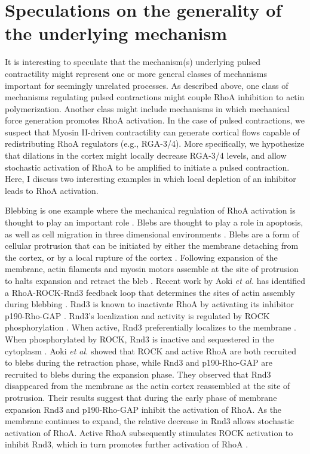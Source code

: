 \documentclass{ucetd}
\begin{document}
	
\section{Speculations on the generality of the underlying mechanism} 
It is interesting to speculate that the mechanism(s) underlying pulsed contractility might represent one or more general classes of mechanisms important for seemingly unrelated processes.  As described above, one class of mechanisms regulating pulsed contractions might couple RhoA inhibition to actin polymerization.  Another class might include mechanisms in which mechanical force generation promotes RhoA activation.  In the case of pulsed contractions, we suspect that Myosin II-driven contractility can generate cortical flows capable of redistributing RhoA regulators (e.g., RGA-3/4).  More specifically, we hypothesize that dilations in the cortex might locally decrease RGA-3/4 levels, and allow stochastic activation of RhoA to be amplified to initiate a pulsed contraction.  Here, I discuss two interesting examples in which local depletion of an inhibitor leads to RhoA activation.


Blebbing is one example where the mechanical regulation of RhoA activation is thought to play an important role \cite{Aoki:2016ek}.  Blebs are thought to play a role in apoptosis, as well as cell migration in three dimensional environments \cite{Charras:2008gf}.  Blebs are a form of cellular protrusion that can be initiated by either the membrane detaching from the cortex, or by a local rupture of the cortex \cite{Charras:2008gf}.  Following expansion of the membrane, actin filaments and myosin motors assemble at the site of protrusion to halts expansion and retract the bleb \cite{Charras:2006io}.  Recent work by Aoki \textit{et al.} has identified a RhoA-ROCK-Rnd3 feedback loop that determines the sites of actin assembly during blebbing \cite{Aoki:2016ek}.  Rnd3 is known to inactivate RhoA by activating its inhibitor p190-Rho-GAP \cite{Wennerberg:2003uv}.  Rnd3's localization and activity is regulated by ROCK phosphorylation \cite{Chardin:2006hn}.  When active, Rnd3 preferentially localizes to the membrane \cite{Chardin:2006hn}.  When phosphorylated by ROCK, Rnd3 is inactive and sequestered in the cytoplasm \cite{Riou:2013kx}.  Aoki \textit{et al.} showed that ROCK and active RhoA are both recruited to blebs during the retraction phase, while Rnd3 and p190-Rho-GAP are recruited to blebs during the expansion phase.  They observed that Rnd3 disappeared from the membrane as the actin cortex reassembled at the site of protrusion.  Their results suggest that during the early phase of membrane expansion Rnd3 and p190-Rho-GAP inhibit the activation of RhoA.  As the membrane continues to expand, the relative decrease in Rnd3 allows stochastic activation of RhoA.  Active RhoA subsequently stimulates ROCK activation to inhibit Rnd3, which in turn promotes further activation of RhoA \cite{Aoki:2016ek}.  
\end{document}
